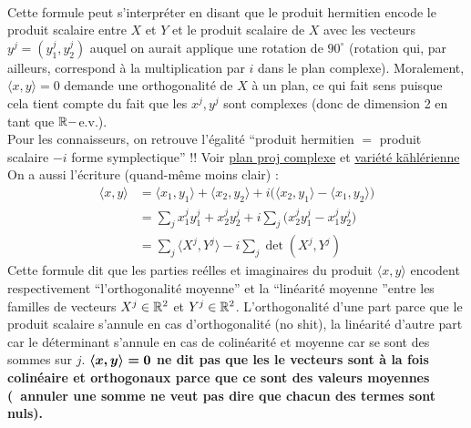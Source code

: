 \\
Cette formule peut s’interpréter en disant que le produit hermitien encode le produit scalaire entre $X$ et $Y$ et le produit scalaire de $X$ avec les vecteurs $y^j=(y^j_1, y^j_2)$  auquel on aurait applique une rotation de $90^\circ$ (rotation qui, par ailleurs, correspond à la multiplication par $i$ dans le plan complexe). Moralement, $\langle x,y \rangle =0$ demande une orthogonalité de $X$ à un plan, ce qui fait sens puisque cela tient compte du fait que les $x^j, y^j$ sont complexes (donc de dimension 2 en tant que $\R-$e.v.).
\\
Pour les connaisseurs, on retrouve l'égalité ``produit hermitien $=$ produit scalaire $-i$ forme symplectique'' !!
Voir
\href{https://fr.wikipedia.org/wiki/Espace_projectif#Espace_projectif_complexe}{plan proj complexe} et \href{https://fr.wikipedia.org/wiki/Vari%C3%A9t%C3%A9_k%C3%A4hl%C3%A9rienne}{variété kählérienne }
\\

On a aussi l'écriture (quand-même moins clair) :
\begin{align*}
	\langle x,y \rangle &= \langle x_1, y_1\rangle + \langle x_2, y_2\rangle 
	+ i\big(\langle x_2, y_1\rangle - \langle x_1,y_2\rangle\big) \\
	&= \sum_j x^j_1 y^j_1+ x^j_2 y^j_2+ i\sum_j \big( x^j_2 y^j_1 - x^j_1y^j_2 \big) \\
	&= \sum_j \big\langle X^j,Y^j\big\rangle - i\sum_j \det(X^j, Y^j)
\end{align*}
Cette formule dit que les parties reélles et imaginaires du produit $\langle x,y \rangle$ encodent respectivement ``l'orthogonalité moyenne'' et la ``linéarité moyenne ''entre les familles de vecteurs $X^j\in\R^2$ et $Y^j\in\R^2$. L'orthogonalité d'une part parce que le produit scalaire s'annule en cas d'orthogonalité (no shit), la linéarité d'autre part car le déterminant s'annule en cas de colinéarité et moyenne car se sont des sommes sur $j$. \textbf{$\bf{\langle x,y \rangle=0}$ ne dit pas que les le vecteurs sont à la fois colinéaire et orthogonaux parce que ce sont des valeurs moyennes (\ie~annuler une somme ne veut pas dire que chacun des termes sont nuls).}
\\

